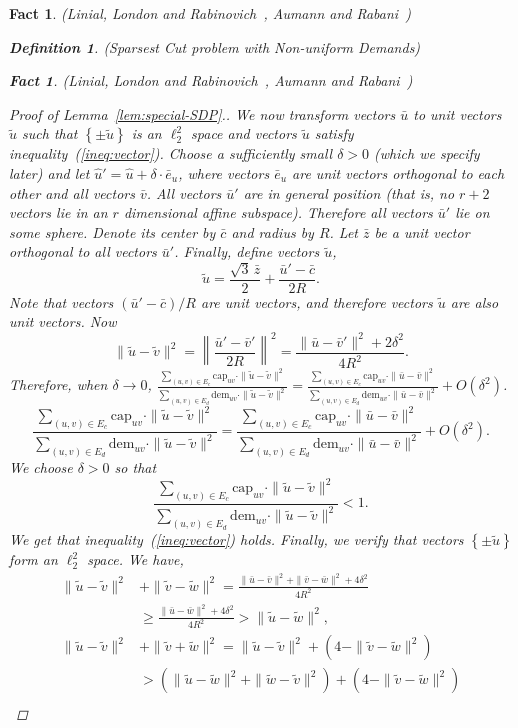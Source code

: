 \documentclass[twoside,leqno,twocolumn]{article}
\newcommand {\set}   [1] {\left\{ #1 \right\}}
\newtheorem{Definition}[theorem]{Definition}
\newtheorem{fact}[theorem]{Fact}
\begin{document}
\begin{fact}{\sc (Linial, London and Rabinovich~\cite{LLR}, Aumann and Rabani~\cite{AR})}
\begin{Definition} {\sc (Sparsest Cut problem with Non-uniform Demands)}
\begin{fact}{\sc (Linial, London and Rabinovich~\cite{LLR}, Aumann and Rabani~\cite{AR})}
\begin{proof}[Proof of Lemma~\ref{lem:special-SDP}.]
We now transform vectors $\bar u$ to unit vectors $\tilde u$ such that $\set{\pm \tilde u}$ is an $\ell_2^2$ space and 
vectors $\tilde u$ satisfy inequality~(\ref{ineq:vector}).
Choose a sufficiently small $\delta>0$ (which we specify later) and let $\hat u' = \hat u + \delta \cdot \bar e_u$, where vectors $\bar e_u$ are unit vectors
orthogonal to each other and all vectors $\bar v$. All vectors $\bar u'$ are in general position (that is, no $r+2$ vectors 
lie in an $r$ dimensional affine subspace). Therefore all vectors $\bar u'$ lie on some sphere. Denote its center by $\bar c$ and radius by
$R$. Let $\bar z$ be a unit vector orthogonal to all vectors $\bar u'$. Finally, define vectors $\tilde u$,
$$\tilde u = \frac{\sqrt{3}\,\bar z}{2}  + \frac{\bar u' - \bar c}{2R}.$$
Note that vectors $(\bar u' - \bar c)/R$ are unit vectors, and therefore vectors $\tilde u$ are also unit vectors.
Now 
$$\|\tilde u - \tilde v\|^2 = \left\|\frac{\bar u' - \bar v'}{2R}\right\|^2 = \frac{\|\bar u - \bar v'\|^2 + 2\delta^2}{4R^2}.$$
Therefore, when $\delta \to 0$,
\ifSODA
$\frac{\sum_{(u,v)\in E_c} \mathrm{cap}_{uv}\cdot \|\tilde u - \tilde v\|^2}{\sum_{(u,v)\in E_d} \mathrm{dem}_{uv}\cdot \|\tilde u - \tilde v\|^2}=
\frac{\sum_{(u,v)\in E_c} \mathrm{cap}_{uv}\cdot\|\bar u - \bar v\|^2}{\sum_{(u,v)\in E_d} \mathrm{dem}_{uv}\cdot\|\bar u - \bar v\|^2} + O(\delta^2)
$.
\else
$$\frac{\sum_{(u,v)\in E_c} \mathrm{cap}_{uv}\cdot \|\tilde u - \tilde v\|^2}{\sum_{(u,v)\in E_d} \mathrm{dem}_{uv}\cdot \|\tilde u - \tilde v\|^2}=
\frac{\sum_{(u,v)\in E_c} \mathrm{cap}_{uv}\cdot\|\bar u - \bar v\|^2}{\sum_{(u,v)\in E_d} \mathrm{dem}_{uv}\cdot\|\bar u - \bar v\|^2} + O(\delta^2).
$$
\fi
We choose $\delta > 0$ so that
$$
\frac{\sum_{(u,v)\in E_c} \mathrm{cap}_{uv}\cdot \|\tilde u - \tilde v\|^2}{\sum_{(u,v)\in E_d} \mathrm{dem}_{uv}\cdot \|\tilde u - \tilde v\|^2} < 1.
$$
We get that inequality~(\ref{ineq:vector}) holds. Finally, we verify that vectors $\set{\pm\tilde u}$ form an $\ell_2^2$ space.
We have,
\ifSODA
\begin{align*}
\|\tilde u - \tilde v\|^2 &{} + \|\tilde v - \tilde w\|^2 = 
\frac{\|\bar u - \bar v\|^2 + \|\bar v - \bar w\|^2 + 4\delta^2}{4R^2}\\
&\geq
\frac{\|\bar u - \bar w\|^2 + 4\delta^2}{4R^2} > \|\tilde u - \tilde w\|^2,\\
\|\tilde u - \tilde v\|^2 &{}+ \|\tilde v + \tilde w\|^2 =
\|\tilde u - \tilde v\|^2 +  (4 - \|\tilde v - \tilde w\|^2) \\
& > 
(\|\tilde u - \tilde w\|^2 + \|\tilde w - \tilde v\|^2) + (4 - \|\tilde v - \tilde w\|^2)\\

\end{align*}
\end{proof}
\end{fact}
\end{Definition}
\end{fact}
\end{document}

